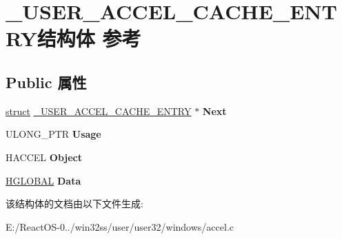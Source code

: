 \hypertarget{struct___u_s_e_r___a_c_c_e_l___c_a_c_h_e___e_n_t_r_y}{}\section{\+\_\+\+U\+S\+E\+R\+\_\+\+A\+C\+C\+E\+L\+\_\+\+C\+A\+C\+H\+E\+\_\+\+E\+N\+T\+R\+Y结构体 参考}
\label{struct___u_s_e_r___a_c_c_e_l___c_a_c_h_e___e_n_t_r_y}
\subsection*{Public 属性}
\begin{DoxyCompactItemize}
\item 
\mbox{\label{struct___u_s_e_r___a_c_c_e_l___c_a_c_h_e___e_n_t_r_y_ac19a304836c082c79a90b1a44f793455}} 
\hyperlink{interfacestruct}{struct} \hyperlink{struct___u_s_e_r___a_c_c_e_l___c_a_c_h_e___e_n_t_r_y}{\+\_\+\+U\+S\+E\+R\+\_\+\+A\+C\+C\+E\+L\+\_\+\+C\+A\+C\+H\+E\+\_\+\+E\+N\+T\+RY} $\ast$ {\bfseries Next}
\item 
\mbox{\label{struct___u_s_e_r___a_c_c_e_l___c_a_c_h_e___e_n_t_r_y_a12cd1bfc9ff6b93e15689053a422cf83}} 
U\+L\+O\+N\+G\+\_\+\+P\+TR {\bfseries Usage}
\item 
\mbox{\label{struct___u_s_e_r___a_c_c_e_l___c_a_c_h_e___e_n_t_r_y_ab96a8fde617441d919d6e7eb4629aa59}} 
H\+A\+C\+C\+EL {\bfseries Object}
\item 
\mbox{\label{struct___u_s_e_r___a_c_c_e_l___c_a_c_h_e___e_n_t_r_y_a667ea1d14e3eeff01a02671bee3100e4}} 
\hyperlink{interfacevoid}{H\+G\+L\+O\+B\+AL} {\bfseries Data}
\end{DoxyCompactItemize}


该结构体的文档由以下文件生成\+:\begin{DoxyCompactItemize}
\item 
E\+:/\+React\+O\+S-\/0../win32ss/user/user32/windows/accel.\+c\end{DoxyCompactItemize}
